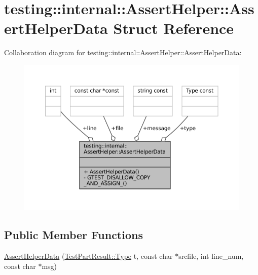 \hypertarget{structtesting_1_1internal_1_1AssertHelper_1_1AssertHelperData}{}\section{testing\+:\+:internal\+:\+:Assert\+Helper\+:\+:Assert\+Helper\+Data Struct Reference}
\label{structtesting_1_1internal_1_1AssertHelper_1_1AssertHelperData}


Collaboration diagram for testing\+:\+:internal\+:\+:Assert\+Helper\+:\+:Assert\+Helper\+Data\+:
\nopagebreak
\begin{figure}[H]
\begin{center}
\leavevmode
\includegraphics[width=350pt]{structtesting_1_1internal_1_1AssertHelper_1_1AssertHelperData__coll__graph}
\end{center}
\end{figure}
\subsection*{Public Member Functions}
\begin{DoxyCompactItemize}
\item 
\hyperlink{structtesting_1_1internal_1_1AssertHelper_1_1AssertHelperData_ad2356f3f1e56d1a63562efe0f8b3f1bb}{Assert\+Helper\+Data} (\hyperlink{classtesting_1_1TestPartResult_a65ae656b33fdfdfffaf34858778a52d5}{Test\+Part\+Result\+::\+Type} t, const char $\ast$srcfile, int line\+\_\+num, const char $\ast$msg)
\end{DoxyCompactItemize}
